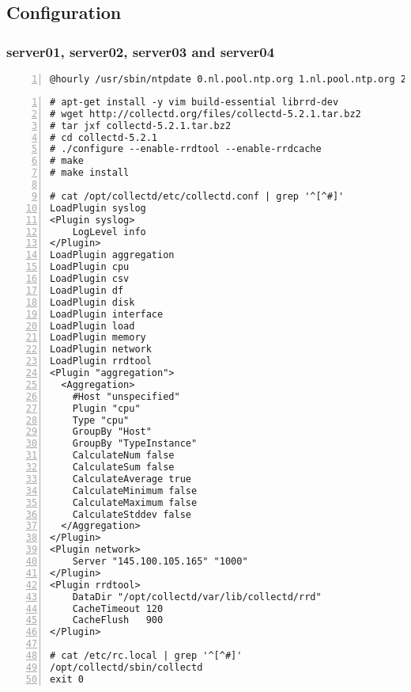 \documentclass[Configuration]{subfiles}
\begin{document}
\newpage
\subsection{Configuration}
\label{sec:Configuration}

\subsubsection{server01, server02, server03 and server04}
\begin{lstlisting}[frame=single,caption=cronjob -l ,backgroundcolor=\color{gray},breaklines=true,numbers=left,]
@hourly /usr/sbin/ntpdate 0.nl.pool.ntp.org 1.nl.pool.ntp.org 2.nl.pool.ntp.org 3.nl.pool.ntp.org
\end{lstlisting}

\begin{lstlisting}[frame=single,caption=Collectd,backgroundcolor=\color{gray},breaklines=true,numbers=left,]
# apt-get install -y vim build-essential librrd-dev
# wget http://collectd.org/files/collectd-5.2.1.tar.bz2
# tar jxf collectd-5.2.1.tar.bz2
# cd collectd-5.2.1
# ./configure --enable-rrdtool --enable-rrdcache
# make 
# make install 

# cat /opt/collectd/etc/collectd.conf | grep '^[^#]'
LoadPlugin syslog
<Plugin syslog>
    LogLevel info
</Plugin>
LoadPlugin aggregation
LoadPlugin cpu
LoadPlugin csv
LoadPlugin df
LoadPlugin disk
LoadPlugin interface
LoadPlugin load
LoadPlugin memory
LoadPlugin network
LoadPlugin rrdtool
<Plugin "aggregation">
  <Aggregation>
    #Host "unspecified"
    Plugin "cpu"
    Type "cpu"
    GroupBy "Host"
    GroupBy "TypeInstance"
    CalculateNum false
    CalculateSum false
    CalculateAverage true
    CalculateMinimum false
    CalculateMaximum false
    CalculateStddev false
  </Aggregation>
</Plugin>
<Plugin network>
    Server "145.100.105.165" "1000"
</Plugin> 
<Plugin rrdtool>
    DataDir "/opt/collectd/var/lib/collectd/rrd"
    CacheTimeout 120
    CacheFlush   900
</Plugin>

# cat /etc/rc.local | grep '^[^#]'
/opt/collectd/sbin/collectd
exit 0
\end{lstlisting}
\end{document}
